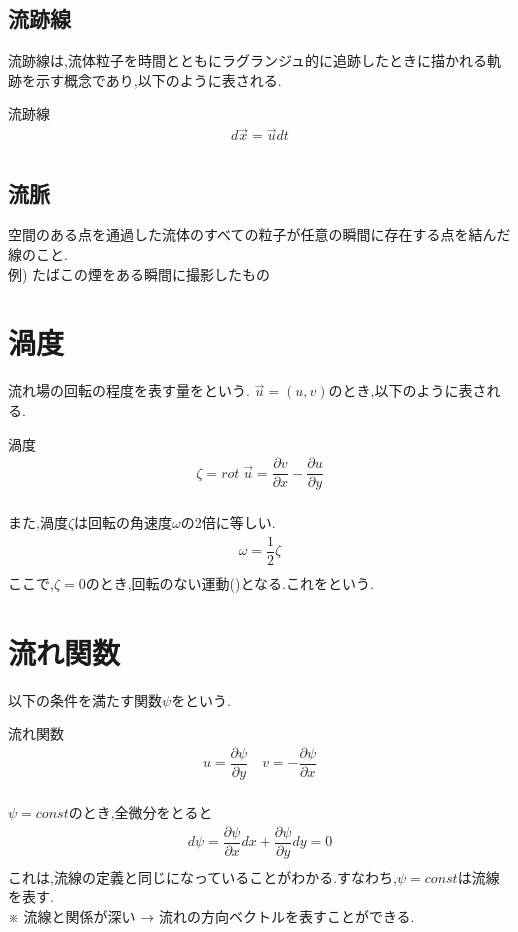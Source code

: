 \documentclass[a4paper]{jsarticle}
\begin{document}
\subsection{流跡線}
流跡線は,流体粒子を時間とともにラグランジュ的に追跡したときに描かれる軌跡を示す概念であり,以下のように表される.
\begin{itembox}[l]{流跡線}
    \begin{eqnarray*}
        d\vec{x}=\vec{u}dt\\
    \end{eqnarray*}
\end{itembox}
\subsection{流脈}
空間のある点を通過した流体のすべての粒子が任意の瞬間に存在する点を結んだ線のこと.\\
例) たばこの煙をある瞬間に撮影したもの
\section{渦度}
流れ場の回転の程度を表す量をという.
$\vec{u}=\left(u,v\right)$のとき,以下のように表される.
\begin{itembox}[l]{渦度}
    \begin{eqnarray*}
        \zeta = rot\;\vec{u}=\dfrac{\partial v}{\partial x}-\dfrac{\partial u}{\partial y}\\
    \end{eqnarray*}
\end{itembox}
また,渦度$\zeta$は回転の角速度$\omega$の2倍に等しい.
\begin{eqnarray*}
    \omega = \dfrac{1}{2}\zeta\\
\end{eqnarray*}
ここで,$\zeta=0$のとき,回転のない運動()となる.これをという.
\section{流れ関数}
以下の条件を満たす関数$\psi$をという.
\begin{itembox}[l]{流れ関数}
    \begin{eqnarray*}
        u=\dfrac{\partial \psi}{\partial y}\quad v=-\dfrac{\partial \psi}{\partial x}\\
    \end{eqnarray*}
\end{itembox}
$\psi =const$のとき,全微分をとると\\
\begin{eqnarray*}
    d\psi = \dfrac{\partial \psi}{\partial x}dx+\dfrac{\partial \psi}{\partial y}dy=0\\
\end{eqnarray*}
これは,流線の定義と同じになっていることがわかる.すなわち,$\psi = const$は流線を表す.\\
※ 流線と関係が深い → 流れの方向ベクトルを表すことができる.
\end{document}
